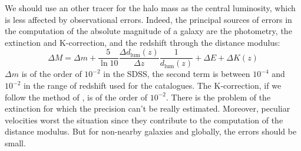 We should use an other tracer for the halo mass as the central luminosity,
which is less affected by observational errors. Indeed, the principal
sources of errors in the computation of the absolute magnitude of a galaxy
are the photometry, the extinction and K-correction, and the redshift
through the distance modulus:
%
\begin{equation}
    \Delta M=\Delta m + \frac{5}{\ln{10}}
    \frac{\Delta d_\mathrm{lum} \left(z\right)}{\Delta z}
    \frac{1}{d_\mathrm{lum} \left(z\right)} + \Delta E + \Delta K\left(z\right)
\end{equation}
%
$\Delta m$ is of the order of $10^{-2}$ in the SDSS, the second term is
between $10^{-4}$ and $10^{-2}$ in the range of redshift used for the
catalogues. The K-correction, if we follow the method of
\citet{Chilingarian+10}, is of the order of $10^{-2}$. There is the problem
of the extinction for which the precision can't be really estimated.
Moreover, peculiar velocities worst the situation since they contribute to
the computation of the distance modulus. But for non-nearby galaxies and
globally, the errors should be small.

